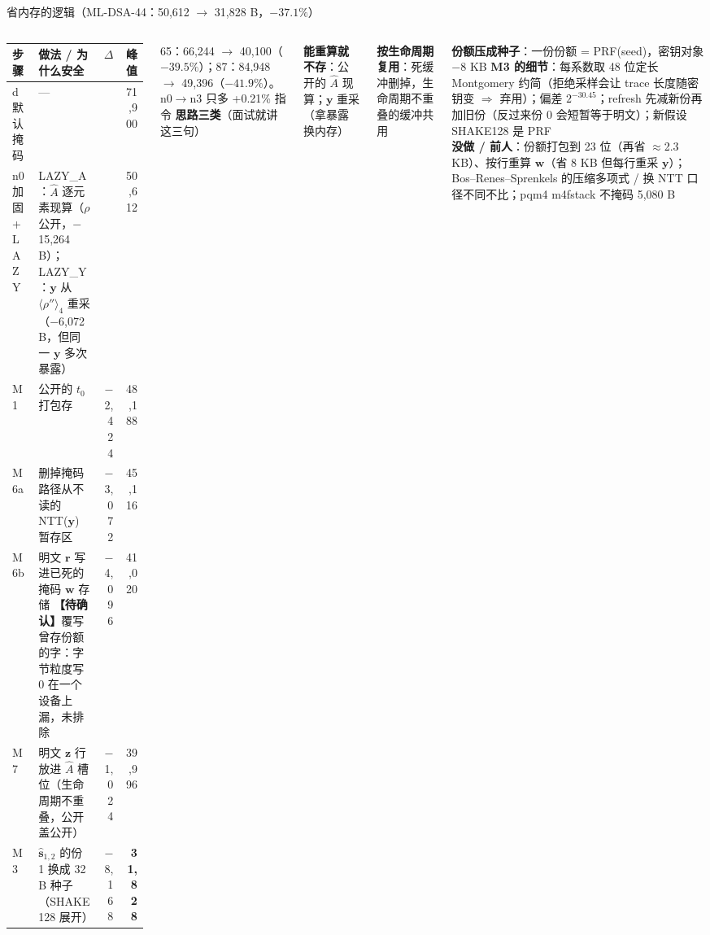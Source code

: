 \documentclass[aspectratio=169,10pt,fontset=none]{ctexbeamer}
\newcommand{\warn}[1]{{\color{warn}\textbf{【待确认】}#1}}
\newcommand{\src}[1]{{\scriptsize\color{gray}#1}}
\begin{document}
\begin{frame}{省内存的逻辑（ML-DSA-44：50,612 $\to$ 31,828 B，$-37.1\%$）}
\begin{columns}[T]
{\scriptsize\renewcommand{\arraystretch}{1.12}
\begin{tabularx}{\linewidth}{@{}p{1.9cm}Y r r@{}}\toprule
步骤 & 做法 / 为什么安全 & $\Delta$ & 峰值 \\\midrule
d 默认掩码 & — & & 71,900 \\
n0 加固+LAZY & LAZY\_A：$\hat A$ 逐元素现算（$\rho$ 公开，$-$15,264 B）；LAZY\_Y：$\mathbf y$ 从 $\langle\rho''\rangle_4$ 重采（$-$6,072 B，\alert{但同一 $\mathbf y$ 多次暴露}）& & 50,612 \\
M1 & 公开的 $t_0$ 打包存 & $-$2,424 & 48,188 \\
M6a & 删掉掩码路径从不读的 NTT($\mathbf y$) 暂存区 & $-$3,072 & 45,116 \\
M6b & 明文 $\mathbf r$ 写进已死的掩码 $\mathbf w$ 存储 \warn{覆写曾存份额的字：字节粒度写 0 在一个设备上漏，未排除} & $-$4,096 & 41,020 \\
M7 & 明文 $\mathbf z$ 行放进 $\hat A$ 槽位（生命周期不重叠，公开盖公开）& $-$1,024 & 39,996 \\
M3 & $\hat{\mathbf s}_{1,2}$ 的份 1 换成 32 B 种子（SHAKE128 展开）& $-$8,168 & \textbf{31,828} \\\bottomrule
\end{tabularx}}
\src{65：66,244 $\to$ 40,100（$-39.5\%$）；87：84,948 $\to$ 49,396（$-41.9\%$）。n0$\to$n3 只多 +0.21\% 指令}
\textbf{思路三类}（面试就讲这三句）
\enumerate
  \item \textbf{能重算就不存}：公开的 $\hat A$ 现算；$\mathbf y$ 重采（拿暴露换内存）
  \item \textbf{按生命周期复用}：死缓冲删掉，生命周期不重叠的缓冲共用
  \item \textbf{份额压成种子}：一份份额 = PRF(seed)，密钥对象 $-$8 KB
\endenumerate
\textbf{M3 的细节}：每系数取 48 位定长 Montgomery 约简（拒绝采样会让 trace 长度随密钥变 $\Rightarrow$ 弃用）；偏差 $2^{-30.45}$；refresh 先减新份再加旧份（反过来份 0 会短暂等于明文）；新假设 SHAKE128 是 PRF\\[2pt]
\textbf{没做 / 前人}：份额打包到 23 位（再省 $\approx$2.3 KB）、按行重算 $\mathbf w$（省 8 KB 但每行重采 $\mathbf y$）；Bos--Renes--Sprenkels 的压缩多项式 / 换 NTT 口径不同不比；pqm4 m4fstack 不掩码 5,080 B
\end{columns}
\end{frame}
\end{document}
